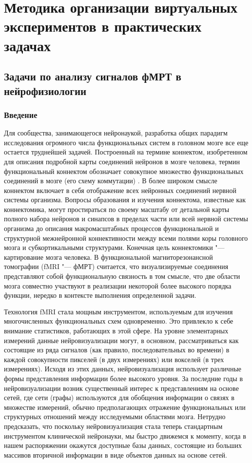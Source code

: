 \chapter{Методика организации виртуальных экспериментов в практических задачах} \label{chapt3}

\section{Задачи по анализу сигналов фМРТ в нейрофизиологии}\label{sect_4_1}
\subsection{Введение}
Для сообщества, занимающегося нейронаукой, разработка общих парадигм исследования огромного числа функциональных систем 
в головном мозге все еще остается труднейшей задачей. Построенный на термине коннектом, изобретенном для описания 
подробной карты соединений нейронов в мозге человека, термин функциональный коннектом обозначает совокупное множество 
функциональных соединений в мозге (его схему коммутации) \cite{biswal2010toward}. В более широком смысле коннектом 
включает в себя отображение всех нейронных соединений нервной системы организма. Вопросы образования и изучения 
коннектома, известные как коннектомика, могут простираться по своему масштабу от детальной карты полного набора 
нейронов и синапсов в пределах части или всей нервной системы организма до описания макромасштабных процессов 
\cite{craddock2013imaging} функциональной и структурной межнейронной коннективности между всеми полями коры головного 
мозга и субкортикальными структурами. Конечная цель коннектомики "--- картирование мозга человека. В функциональной 
магниторезонансной томографии (fMRI "--- фМРТ) считается, что визуализируемые соединения представляют собой 
функциональную связность в том смысле, что две области мозга совместно участвуют в реализации некоторой более высокого 
порядка функции, нередко в контексте выполнения определенной задачи. 

Технология fMRI стала мощным инструментом, используемым для изучения многочисленных функциональных схем одновременно. 
Это привлекло к себе внимание статистиков, работающих в этой сфере. На уровне элементарных измерений данные 
нейровизуализации могут, в основном, рассматриваться как состоящие из ряда сигналов (как правило, последовательных во 
времени) в каждой совокупности пикселей (в двух измерениях) или вокселей (в трех измерениях). Исходя из этих данных, 
нейровизуализация использует различные формы представления информации более высокого уровня. За последние годы в 
нейровизуализации возник существенный интерес к представлениям на основе сетей, где сети (графы) используются для 
обобщения информации о связях в множестве измерений, обычно предполагающих отражение функциональных или структурных 
отношений между исследуемыми областями мозга. Нетрудно предсказать, что поскольку нейровизуализация стала теперь 
стандартным инструментом клинической нейронауки, мы быстро движемся к моменту, когда в нашем распоряжении окажутся 
доступные базы данных, состоящие из больших массивов вторичной информации в виде объектов данных на основе сетей. 

